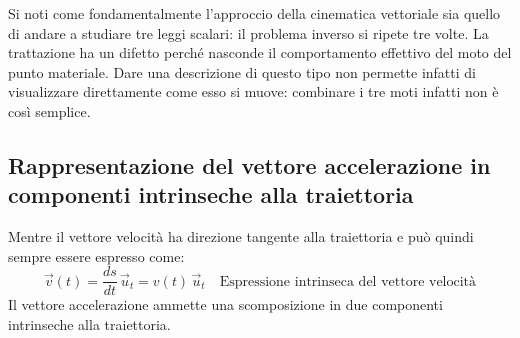 \documentclass[10pt,a4paper]{book}
\begin{document}
Si noti come fondamentalmente l'approccio della cinematica vettoriale sia quello di andare a studiare tre leggi scalari: il problema inverso si ripete tre volte. La trattazione ha un difetto perché nasconde il comportamento effettivo del moto del punto materiale. Dare una descrizione di questo tipo non permette infatti di visualizzare direttamente come esso si muove: combinare i tre moti infatti non è così semplice.

\subsection{Rappresentazione del vettore accelerazione in componenti intrinseche alla traiettoria}

Mentre il vettore velocità ha direzione tangente alla traiettoria e può quindi sempre essere espresso come:
\[
	\vec{v}(t)=\frac{ds}{dt}\,\vec{u}_t=v(t)\,\vec{u}_t \quad \text{Espressione intrinseca del vettore velocità}
\]
Il vettore accelerazione ammette una scomposizione in due componenti intrinseche alla traiettoria.
\end{document}
